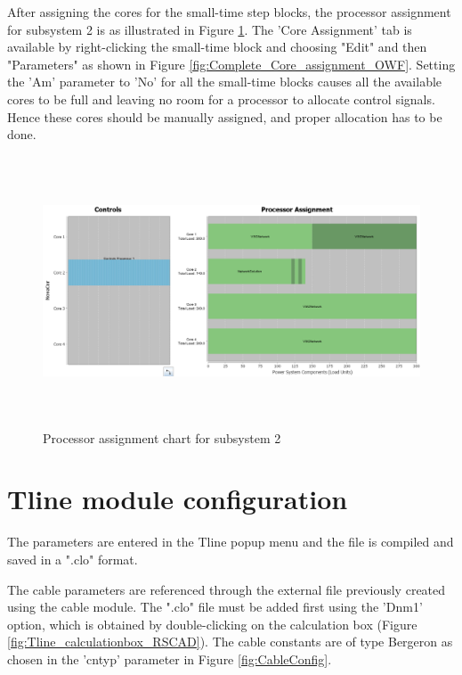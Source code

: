 After assigning the cores for the small-time step blocks, the processor assignment for subsystem 2 is as illustrated in Figure \ref{fig:subsystem2_processor}. The 'Core Assignment' tab is available by right-clicking the small-time block and choosing "Edit" and then "Parameters" as shown in Figure \ref{fig:Complete_Core_assignment_OWF}. Setting the 'Am' parameter to 'No' for all the small-time blocks causes all the available cores to be full and leaving no room for a processor to allocate control signals. Hence these cores should be manually assigned, and proper allocation has to be done.

\begin{figure}[H]
\centering
    \includegraphics[height = 8cm,width = 17cm]{Diagrams/Chapter_4/subsystem2_processor.PNG}
    \caption{Processor assignment chart for subsystem 2}
    \label{fig:subsystem2_processor}
\end{figure}


\section{Tline module configuration}\label{config_Tline}
The parameters are entered in the Tline popup menu and the file is compiled and saved in a ".clo" format.

The cable parameters are referenced through the external file previously created using the cable module. %
The ".clo" file must be added first using the 'Dnm1' option, which is obtained by double-clicking on the calculation box (Figure \ref{fig:Tline_calculationbox_RSCAD}). The cable constants are of type Bergeron as chosen in the 'cntyp' parameter in Figure \ref{fig:CableConfig}.

